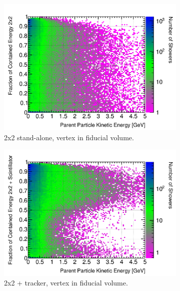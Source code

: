 \documentclass[10pt,a4paper,openany]{article}
\begin{document}
\begin{figure}[!htb]
\begin{subfigure}[b]{0.49\textwidth}
		\label{}
	\end{subfigure}	
	\begin{subfigure}[b]{0.49\textwidth}
		\centering
    \includegraphics[width=1.0\textwidth]{Pi0_contained_frac_2x2_fiducial.png}
		\caption{2x2 stand-alone, vertex in fiducial volume.}
		\label{}
	\end{subfigure}	
	\hfill
	\begin{subfigure}[b]{0.49\textwidth}
		\centering
		\includegraphics[width=1.0\textwidth]{Pi0_contained_frac_2x2_Scintillator_fiducial_gap.png}
		\caption{2x2 + tracker, vertex in fiducial volume.}
		\label{}
	\end{subfigure}
	\begin{subfigure}[b]{0.49\textwidth}
		\centering

\end{subfigure}
\end{figure}
\end{document}
